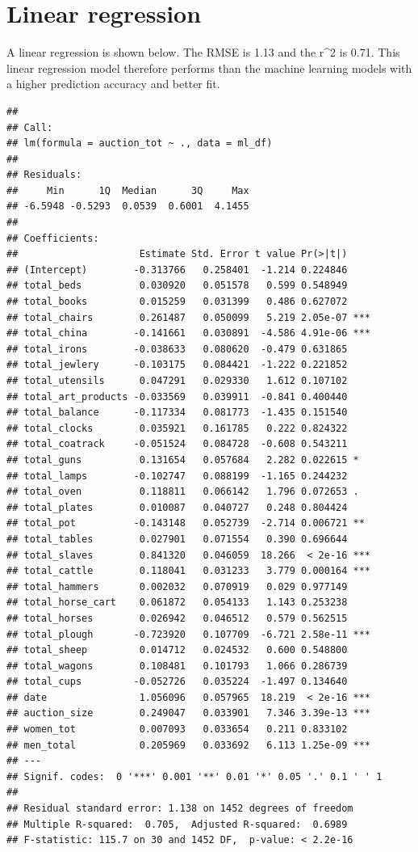\documentclass[11pt,preprint, authoryear]{elsarticle}
\numberwithin{equation}{section}
\numberwithin{figure}{section}
\numberwithin{table}{section}
\begin{document}
\hypertarget{linear-regression}{%
\section{Linear regression}\label{linear-regression}}

A linear regression is shown below. The RMSE is 1.13 and the r\^{}2 is
0.71. This linear regression model therefore performs than the machine
learning models with a higher prediction accuracy and better fit.

\begin{verbatim}
## 
## Call:
## lm(formula = auction_tot ~ ., data = ml_df)
## 
## Residuals:
##     Min      1Q  Median      3Q     Max 
## -6.5948 -0.5293  0.0539  0.6001  4.1455 
## 
## Coefficients:
##                     Estimate Std. Error t value Pr(>|t|)    
## (Intercept)        -0.313766   0.258401  -1.214 0.224846    
## total_beds          0.030920   0.051578   0.599 0.548949    
## total_books         0.015259   0.031399   0.486 0.627072    
## total_chairs        0.261487   0.050099   5.219 2.05e-07 ***
## total_china        -0.141661   0.030891  -4.586 4.91e-06 ***
## total_irons        -0.038633   0.080620  -0.479 0.631865    
## total_jewlery      -0.103175   0.084421  -1.222 0.221852    
## total_utensils      0.047291   0.029330   1.612 0.107102    
## total_art_products -0.033569   0.039911  -0.841 0.400440    
## total_balance      -0.117334   0.081773  -1.435 0.151540    
## total_clocks        0.035921   0.161785   0.222 0.824322    
## total_coatrack     -0.051524   0.084728  -0.608 0.543211    
## total_guns          0.131654   0.057684   2.282 0.022615 *  
## total_lamps        -0.102747   0.088199  -1.165 0.244232    
## total_oven          0.118811   0.066142   1.796 0.072653 .  
## total_plates        0.010087   0.040727   0.248 0.804424    
## total_pot          -0.143148   0.052739  -2.714 0.006721 ** 
## total_tables        0.027901   0.071554   0.390 0.696644    
## total_slaves        0.841320   0.046059  18.266  < 2e-16 ***
## total_cattle        0.118041   0.031233   3.779 0.000164 ***
## total_hammers       0.002032   0.070919   0.029 0.977149    
## total_horse_cart    0.061872   0.054133   1.143 0.253238    
## total_horses        0.026942   0.046512   0.579 0.562515    
## total_plough       -0.723920   0.107709  -6.721 2.58e-11 ***
## total_sheep         0.014712   0.024532   0.600 0.548800    
## total_wagons        0.108481   0.101793   1.066 0.286739    
## total_cups         -0.052726   0.035224  -1.497 0.134640    
## date                1.056096   0.057965  18.219  < 2e-16 ***
## auction_size        0.249047   0.033901   7.346 3.39e-13 ***
## women_tot           0.007093   0.033654   0.211 0.833102    
## men_total           0.205969   0.033692   6.113 1.25e-09 ***
## ---
## Signif. codes:  0 '***' 0.001 '**' 0.01 '*' 0.05 '.' 0.1 ' ' 1
## 
## Residual standard error: 1.138 on 1452 degrees of freedom
## Multiple R-squared:  0.705,  Adjusted R-squared:  0.6989 
## F-statistic: 115.7 on 30 and 1452 DF,  p-value: < 2.2e-16
\end{verbatim}
\end{document}
